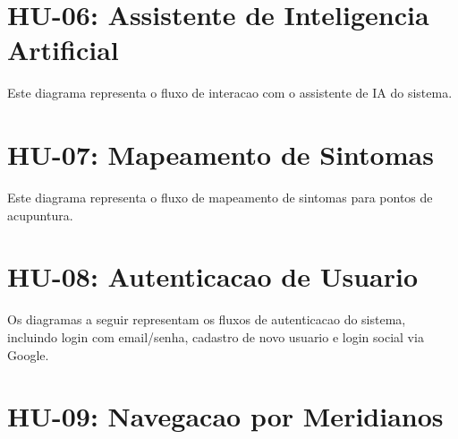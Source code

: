 \begin{apendicesenv}

\section{HU-06: Assistente de Inteligencia Artificial}
\label{apendice:seq-ia}

Este diagrama representa o fluxo de interacao com o assistente de IA do sistema.


\section{HU-07: Mapeamento de Sintomas}
\label{apendice:seq-mapper}

Este diagrama representa o fluxo de mapeamento de sintomas para pontos de acupuntura.


\section{HU-08: Autenticacao de Usuario}
\label{apendice:seq-auth}

Os diagramas a seguir representam os fluxos de autenticacao do sistema, incluindo login com email/senha, cadastro de novo usuario e login social via Google.




\section{HU-09: Navegacao por Meridianos}
\label{apendice:seq-meridians}


\end{apendicesenv}
